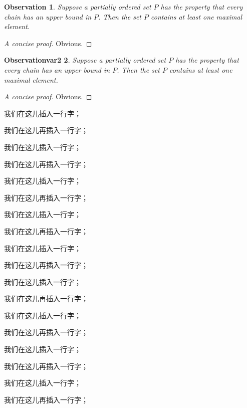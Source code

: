 \newtheorem{observation}{Observation}[chapter]
\begin{observation}
  Suppose a partially ordered set $P$ has the property
  that every chain has an upper bound in $P$. Then the
  set $P$ contains at least one maximal element.
\end{observation}
\begin{proof}[A concise proof]
  Obvious.
\end{proof}

\newtheorem{observationvar2}[observation]{Observationvar2}
\begin{observationvar2}
  Suppose a partially ordered set $P$ has the property
  that every chain has an upper bound in $P$. Then the
  set $P$ contains at least one maximal element.
\end{observationvar2}
\begin{proof}[A concise proof]
  Obvious.
\end{proof}

我们在这儿插入一行字；

我们在这儿再插入一行字；

我们在这儿插入一行字；

我们在这儿再插入一行字；

我们在这儿插入一行字；

我们在这儿再插入一行字；

我们在这儿插入一行字；

我们在这儿再插入一行字；

我们在这儿插入一行字；

我们在这儿再插入一行字；

我们在这儿插入一行字；

我们在这儿再插入一行字；

我们在这儿插入一行字；

我们在这儿再插入一行字；

我们在这儿插入一行字；

我们在这儿再插入一行字；

我们在这儿插入一行字；

我们在这儿再插入一行字；
